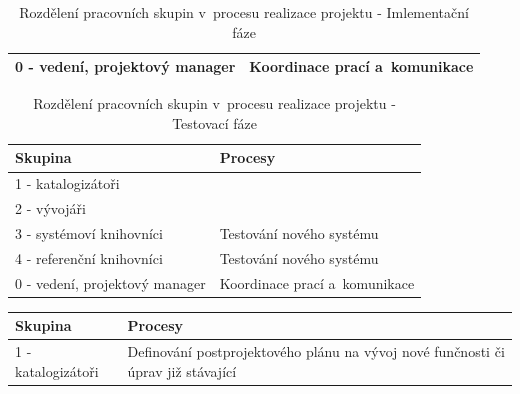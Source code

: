 \documentclass[
	11pt, oneside, printed, final, palatino, monochrome
	microtype,
	table,   %
	lof,     %
	lot     %
]{fithesis3}
\newcommand{\bold}[1]{\textbf{#1}}
\begin{document}
{\begin{table}
\begin{tabular}{| p{3cm} | p{8.3cm} |}
	0 - vedení, projektový manager
    & 
    Koordinace prací a~komunikace
    \\ \hline
    
    \end{tabular}
    \caption{Rozdělení pracovních skupin v~procesu realizace projektu - Imlementační fáze}
\end{table}

\begin{table}
    \centering
    \begin{tabular}{| p{3cm} | p{8.3cm} |}
    \hline
    \bold{Skupina} 	
    & 
    \bold{Procesy} 
    \\ \hline
    
	1 - katalogizátoři
    & 

    \\ \hline
    
	2 - vývojáři
    & 

    \\ \hline
    
	3 - systémoví knihovníci
    & 
    Testování nového systému
    \\ \hline
    
	4 - referenční knihovníci
    & 
    Testování nového systému
    \\ \hline
    
	0 - vedení, projektový manager
    & 
    Koordinace prací a~komunikace
    \\ \hline
    
    \end{tabular}
    \caption{Rozdělení pracovních skupin v~procesu realizace projektu - Testovací fáze}
\end{table}

\begin{table}
    \centering
    \begin{tabular}{| p{3cm} | p{8.3cm} |}
    \hline
    \bold{Skupina} 	
    & 
    \bold{Procesy} 
    \\ \hline
    
	1 - katalogizátoři
    & 
	Definování postprojektového plánu na vývoj nové funčnosti či úprav již stávající
    \\ \hline
    

\end{tabular}
\end{table}}
\end{document}
